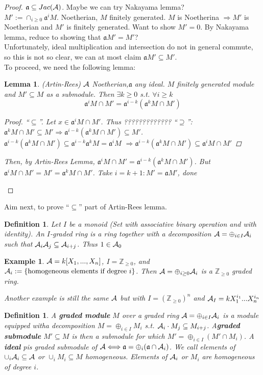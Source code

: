 \documentclass[11pt]{article}
\newtheorem{lemma}[thm]{Lemma}
\newtheorem{dfn}[thm]{Definition}
\newtheorem{ex}[thm]{Example}
\newcommand{\intg}{\mathbb Z}
\newcommand{\sca}{{\mathfrak a}}
\newcommand{\cala}{{\cal A}}
\newcommand{\Lrta}{\Longrightarrow}
\newcommand{\Llrta}{\Longleftrightarrow}
\begin{document}
\begin{proof}
$\sca\subseteq Jac(\cala)$. Maybe we can try Nakayama lemma?\\
$M':=\cap_{i\geq 0}\sca^i M.$ Noetherian, $M$ finitely generated. $M$ is Noetherina $\Lrta M'$ is Noetherian and $M'$ is finitely generated. Want to show $M'=0$. By Nakayama lemma, reduce to showing that $\sca M'=M'$?\\
Unfortunately, ideal multiplication and intersection do not in general commute, so this is not so clear, we can at most claim $\sca M'\subseteq M'$.\\ 
To proceed, we need the following lemma:
\begin{lemma}
(Artin-Rees) $\cala$ Noetherian,$\sca$ any ideal. $M$ finitely generated module and $M'\subseteq M$ as a submodule. Then $\exists k\geq 0 $ s.t. $\forall i\geq k$
$$
\sca^i M\cap M'=\sca^{i-k}(\sca^k M\cap M')
$$
\begin{proof}
``$\subseteq$''. Let $x\in \sca^i M\cap M'$. Thus 
?????????????
``$\supseteq$'':$\sca^k M\cap M'\subseteq M'\Lrta \sca^{i-k}(\sca^k M\cap M')\subseteq M'$. $\sca^{i-k}(\sca^k M\cap M')\subseteq \sca^{i-k}\sca^k M=\sca^i M$
$\Lrta\sca^{i-k}(\sca^k M\cap M')\subseteq \sca^i M\cap M'$
\end{proof}

Then, by Artin-Rees Lemma, $\sca^i M\cap M'=\sca^{i-k}(\sca^k M\cap M')$. But $\sca^i M\cap M'=M'=\sca^k M\cap M'$. Take $i=k+1: M'=\sca M'$, done
\end{lemma}
\end{proof}

Aim next, to prove ``$\subseteq $'' part of Artin-Rees lemma.
\begin{dfn}
Let $I$ be a monoid (Set with associative binary operation and with identity). An $I$-graded ring is a ring together with a decomposition $\cala=\oplus_{i\in I}\cala_i$ such that $\cala_i\cala_j\subseteq \cala_{i+j}$. Thus $1\in \cala_0$
\end{dfn}

\begin{ex}
$\cala=k[X_1,...,X_n]$, $I=\intg_{\geq 0}$, and $\cala_i:=\{\text{homogeneous elements if degree $i$}\}$. Then $\cala=\oplus_{i\geq 0}\cala_i$ is a $\intg_{\geq 0}$ graded ring.

Another example is still the same $\cala$ but with $I=(\intg_{\geq 0})^n$ and $\cala_I=k X_1^{i_1}...X_n^{i_n}$
\end{ex}

\begin{dfn}
A \textbf{graded module} $M$ over a graded ring $\cala=\oplus_{i\in I}\cala_i$ is a module equipped witha decomposition $M=\oplus_{i\in I } M_i$
 s.t. $\cala_i\cdot M_j\subseteq M_{i+j}$. A\textbf{graded submodule } $M'\subseteq M$ is then a submodule for which $M'=\oplus_{i\in I}(M'\cap M_i)$. A \textbf{ideal} pis  graded submodule of $\cala\Llrta\sca=\oplus_i(\sca\cap \cala_i)$.
We call elements of $\cup_i\cala_i\subseteq \cala$ or $\cup_i M_i\subseteq M$ homogeneous. Elements of $\cala_i$ or $M_i$ are homogeneous of degree $i$.
\end{dfn}
\end{document}
